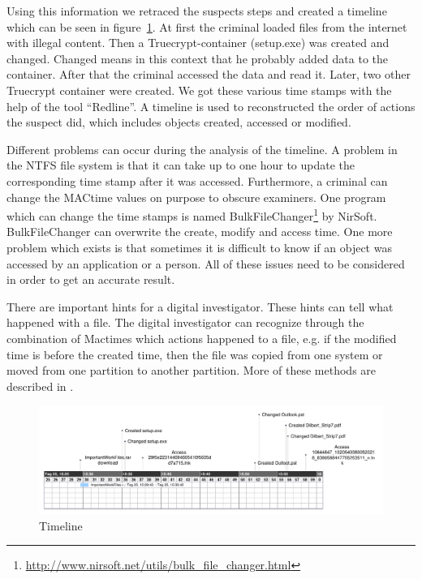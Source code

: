 Using this information we retraced the suspects steps and created a timeline which can be seen in figure~\ref{fig:timeline}.
At first the criminal loaded files from the internet with illegal content. 
Then a Truecrypt-container (setup.exe) was created and changed. 
Changed means in this context that he probably added data to the container.
After that the criminal accessed the data and read it. 
Later, two other Truecrypt container were created. 
We got these various time stamps with the help of the tool “Redline”. 
A timeline is used to reconstructed the order of actions the suspect did, which includes objects created, accessed or modified.

Different problems can occur during the analysis of the timeline.
A problem in the NTFS file system is that it can take up to one hour to update the corresponding time stamp after it was accessed.\cite{FileTimes} 
Furthermore, a criminal can change the MACtime values on purpose to obscure examiners. 
One program which can change the time stamps is named BulkFileChanger\footnote{\url{http://www.nirsoft.net/utils/bulk_file_changer.html}} by NirSoft.
BulkFileChanger can overwrite the create, modify and access time. 
One more problem which exists is that sometimes it is difficult to know if an object was accessed by an application or a person. 
All of these issues need to be considered in order to get an accurate result. 

There are important hints for a digital investigator. 
These hints can tell what happened with a file. 
The digital investigator can recognize through the combination of Mactimes which actions happened to a file, e.g. if the modified time is before the created time, then the file was copied from one system or moved from one partition to another partition. 
More of these methods are described in \cite{alazab2009effective}.

\begin{figure}[tbph]
	\centering
		\includegraphics[width=\textwidth]{graphics/Timeline.pdf} 	
	\caption{Timeline}
	\label{fig:timeline}
\end{figure}

